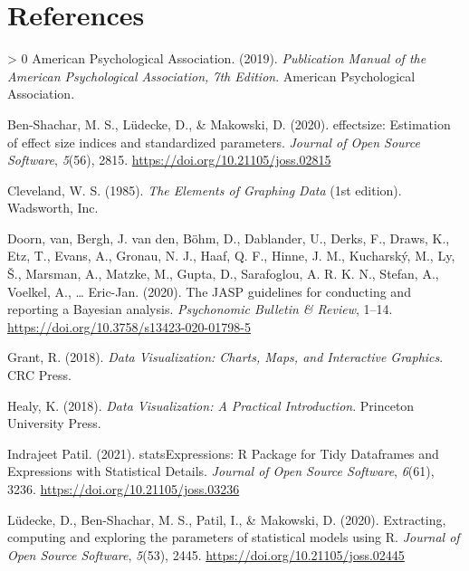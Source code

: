 \documentclass[10pt,a4paper,onecolumn]{article}
\newlength{\cslhangindent}
\newenvironment{CSLReferences}[3] %
 {%
  \setlength{\parindent}{0pt}
  \ifodd #1 \everypar{\setlength{\hangindent}{\cslhangindent}}\ignorespaces\fi
  \ifnum #2 > 0
  \setlength{\parskip}{#2\baselineskip}
  \fi
 }%
 {}
\begin{document}
\hypertarget{references}{%
\section*{References}\label{references}}

\hypertarget{refs}{}
\begin{CSLReferences}{1}{0}
\leavevmode\hypertarget{ref-apa2019}{}%
American Psychological Association. (2019). \emph{Publication {Manual}
of the {American Psychological Association}, 7th {Edition}}. {American
Psychological Association}.

\leavevmode\hypertarget{ref-Ben-Shachar2020}{}%
Ben-Shachar, M. S., Lüdecke, D., \& Makowski, D. (2020). {e}ffectsize:
Estimation of effect size indices and standardized parameters.
\emph{Journal of Open Source Software}, \emph{5}(56), 2815.
\url{https://doi.org/10.21105/joss.02815}

\leavevmode\hypertarget{ref-cleveland1985}{}%
Cleveland, W. S. (1985). \emph{The {Elements} of {Graphing Data}} (1st
edition). {Wadsworth, Inc.}

\leavevmode\hypertarget{ref-van2020jasp}{}%
Doorn, van, Bergh, J. van den, Böhm, D., Dablander, U., Derks, F.,
Draws, K., Etz, T., Evans, A., Gronau, N. J., Haaf, Q. F., Hinne, J. M.,
Kucharský, M., Ly, Š., Marsman, A., Matzke, M., Gupta, D., Sarafoglou,
A. R. K. N., Stefan, A., Voelkel, A., \ldots{} Eric-Jan. (2020). The
JASP guidelines for conducting and reporting a {B}ayesian analysis.
\emph{Psychonomic Bulletin \& Review}, 1--14.
\url{https://doi.org/10.3758/s13423-020-01798-5}

\leavevmode\hypertarget{ref-grant2018data}{}%
Grant, R. (2018). \emph{{Data Visualization: Charts, Maps, and
Interactive Graphics}}. CRC Press.

\leavevmode\hypertarget{ref-healy2018data}{}%
Healy, K. (2018). \emph{{Data Visualization: A Practical Introduction}}.
Princeton University Press.

\leavevmode\hypertarget{ref-Patil2021}{}%
Indrajeet Patil. (2021). {statsExpressions: {R} Package for Tidy
Dataframes and Expressions with Statistical Details}. \emph{{Journal of
Open Source Software}}, \emph{6}(61), 3236.
\url{https://doi.org/10.21105/joss.03236}

\leavevmode\hypertarget{ref-Luxfcdecke2020parameters}{}%
Lüdecke, D., Ben-Shachar, M. S., Patil, I., \& Makowski, D. (2020).
Extracting, computing and exploring the parameters of statistical models
using {R}. \emph{Journal of Open Source Software}, \emph{5}(53), 2445.
\url{https://doi.org/10.21105/joss.02445}


\end{CSLReferences}
\end{document}
